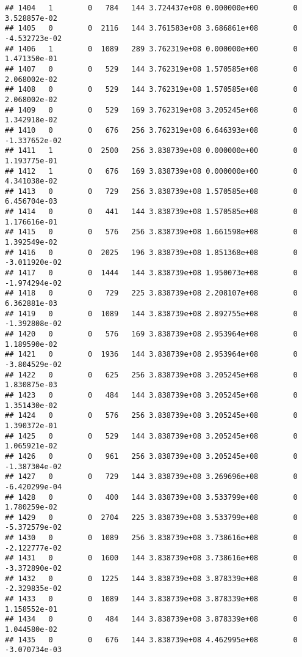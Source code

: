 \documentclass[
]{article}
\begin{document}
\begin{enumerate}
\begin{verbatim}
## 1404   1        0   784   144 3.724437e+08 0.000000e+00        0  3.528857e-02
## 1405   0        0  2116   144 3.761583e+08 3.686861e+08        0 -4.532723e-02
## 1406   1        0  1089   289 3.762319e+08 0.000000e+00        0  1.471350e-01
## 1407   0        0   529   144 3.762319e+08 1.570585e+08        0  2.068002e-02
## 1408   0        0   529   144 3.762319e+08 1.570585e+08        0  2.068002e-02
## 1409   0        0   529   169 3.762319e+08 3.205245e+08        0  1.342918e-02
## 1410   0        0   676   256 3.762319e+08 6.646393e+08        0 -1.337652e-02
## 1411   1        0  2500   256 3.838739e+08 0.000000e+00        0  1.193775e-01
## 1412   1        0   676   169 3.838739e+08 0.000000e+00        0  4.341038e-02
## 1413   0        0   729   256 3.838739e+08 1.570585e+08        0  6.456704e-03
## 1414   0        0   441   144 3.838739e+08 1.570585e+08        0  1.176616e-01
## 1415   0        0   576   256 3.838739e+08 1.661598e+08        0  1.392549e-02
## 1416   0        0  2025   196 3.838739e+08 1.851368e+08        0 -3.011920e-02
## 1417   0        0  1444   144 3.838739e+08 1.950073e+08        0 -1.974294e-02
## 1418   0        0   729   225 3.838739e+08 2.208107e+08        0  6.362881e-03
## 1419   0        0  1089   144 3.838739e+08 2.892755e+08        0 -1.392808e-02
## 1420   0        0   576   169 3.838739e+08 2.953964e+08        0  1.189590e-02
## 1421   0        0  1936   144 3.838739e+08 2.953964e+08        0 -3.804529e-02
## 1422   0        0   625   256 3.838739e+08 3.205245e+08        0  1.830875e-03
## 1423   0        0   484   144 3.838739e+08 3.205245e+08        0  1.351430e-02
## 1424   0        0   576   256 3.838739e+08 3.205245e+08        0  1.390372e-01
## 1425   0        0   529   144 3.838739e+08 3.205245e+08        0  1.065921e-02
## 1426   0        0   961   256 3.838739e+08 3.205245e+08        0 -1.387304e-02
## 1427   0        0   729   144 3.838739e+08 3.269696e+08        0 -6.420299e-04
## 1428   0        0   400   144 3.838739e+08 3.533799e+08        0  1.780259e-02
## 1429   0        0  2704   225 3.838739e+08 3.533799e+08        0 -5.372579e-02
## 1430   0        0  1089   256 3.838739e+08 3.738616e+08        0 -2.122777e-02
## 1431   0        0  1600   144 3.838739e+08 3.738616e+08        0 -3.372890e-02
## 1432   0        0  1225   144 3.838739e+08 3.878339e+08        0 -2.329835e-02
## 1433   0        0  1089   144 3.838739e+08 3.878339e+08        0  1.158552e-01
## 1434   0        0   484   144 3.838739e+08 3.878339e+08        0  1.044580e-02
## 1435   0        0   676   144 3.838739e+08 4.462995e+08        0 -3.070734e-03

\end{verbatim}
\end{enumerate}
\end{document}
